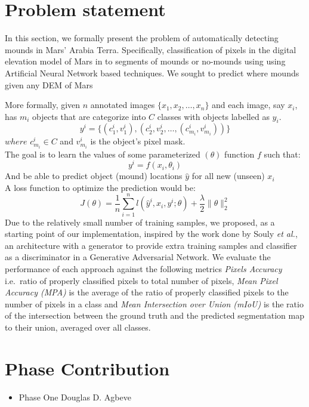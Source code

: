 \documentclass[sigconf,natbib=false]{acmart}
\begin{document}
\section{Problem statement}
In this section, we formally present the problem of automatically detecting
mounds in Mars' Arabia Terra. Specifically, classification of pixels in the
digital elevation model of Mars in to segments of mounds or no-mounds using
using Artificial Neural Network based techniques. We sought to predict where
mounds given any DEM of Mars\par
More formally, given $n$ annotated images $\lbrace x_{1},x_{2},\ldots,x_{n}
\rbrace$ and each image, say $x_{i}$, has $m_{i}$ objects that are categorize
into $C$ classes with objects labelled as $y_{i}$.
\begin{equation}
    y^{i} = \lbrace (c^{i}_{1},v^{i}_{1}), (c^{i}_{2},v^{i}_{2}, \ldots,
    (c^{i}_{m_{i}},v^{i}_{m_{i}})) \rbrace
\end{equation}
\hspace{2em} {$where$} $c^{i}_{m_{i}}\in C$ and $v^{i}_{m_{i}}$ is the object's
pixel mask.\\
The goal is to learn the values of some parameterized $(\theta)$ function $f$
such that:
\begin{equation}
    y^{i} = f(x_{i},\theta_{i})
\end{equation}
And be able to predict object (mound) locations $\hat{y}$ for all new (unseen)
$x_{i}$\\
A loss function to optimize the prediction would be:
\begin{equation}
    J(\theta) = \dfrac{1}{n}\sum_{i=1}^{n}l(\hat{y}^{i},x_{i},y^{i};\theta) +
    \dfrac{\lambda}{2}\| \theta \|^{2}_{2}
\end{equation}
Due to the relatively small number of training samples, we proposed, as a
starting point of our implementation, inspired by the work done by Souly
\textit{et al.}\cite{8237868}, an architecture with a generator to provide extra
training samples and classifier as a discriminator in a Generative Adversarial
Network. We evaluate the performance of each approach against the following
metrics \textit{Pixels Accuracy} i.e.~ratio of properly classified pixels to
total number of pixels, \textit{Mean Pixel Accuracy (MPA)} is the average of the
ratio of properly classified pixels to the number of pixels in a class and
\textit{Mean Intersection over Union (mIoU)} is the ratio of the intersection
between the ground truth and the predicted segmentation map to their union,
averaged over all classes.
\printbibliography{}

\appendix
\section{Phase Contribution}
\begin{itemize}
    \item Phase One \hspace{2em} Douglas D. Agbeve 
\end{itemize}
\end{document}
